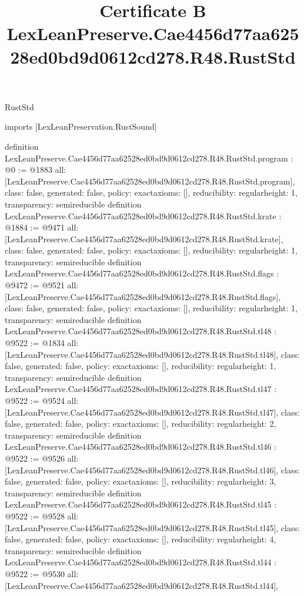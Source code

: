 \begin{lexlean}{RustStd}
\title{Certificate B LexLeanPreserve.Cae4456d77aa62528ed0bd9d0612cd278.R48.RustStd}
\begin{coremodule}
imports [LexLeanPreservation.RustSound]

definition LexLeanPreserve.Cae4456d77aa62528ed0bd9d0612cd278.R48.RustStd.program : @0 := @1883 {
  all: [LexLeanPreserve.Cae4456d77aa62528ed0bd9d0612cd278.R48.RustStd.program],
  class: false,
  generated: false,
  policy: exact{axioms: []},
  reducibility: regular{height: 1},
  transparency: semireducible
}
definition LexLeanPreserve.Cae4456d77aa62528ed0bd9d0612cd278.R48.RustStd.krate : @1884 := @9471 {
  all: [LexLeanPreserve.Cae4456d77aa62528ed0bd9d0612cd278.R48.RustStd.krate],
  class: false,
  generated: false,
  policy: exact{axioms: []},
  reducibility: regular{height: 1},
  transparency: semireducible
}
definition LexLeanPreserve.Cae4456d77aa62528ed0bd9d0612cd278.R48.RustStd.flags : @9472 := @9521 {
  all: [LexLeanPreserve.Cae4456d77aa62528ed0bd9d0612cd278.R48.RustStd.flags],
  class: false,
  generated: false,
  policy: exact{axioms: []},
  reducibility: regular{height: 1},
  transparency: semireducible
}
definition LexLeanPreserve.Cae4456d77aa62528ed0bd9d0612cd278.R48.RustStd.tl48 : @9522 := @1834 {
  all: [LexLeanPreserve.Cae4456d77aa62528ed0bd9d0612cd278.R48.RustStd.tl48],
  class: false,
  generated: false,
  policy: exact{axioms: []},
  reducibility: regular{height: 1},
  transparency: semireducible
}
definition LexLeanPreserve.Cae4456d77aa62528ed0bd9d0612cd278.R48.RustStd.tl47 : @9522 := @9524 {
  all: [LexLeanPreserve.Cae4456d77aa62528ed0bd9d0612cd278.R48.RustStd.tl47],
  class: false,
  generated: false,
  policy: exact{axioms: []},
  reducibility: regular{height: 2},
  transparency: semireducible
}
definition LexLeanPreserve.Cae4456d77aa62528ed0bd9d0612cd278.R48.RustStd.tl46 : @9522 := @9526 {
  all: [LexLeanPreserve.Cae4456d77aa62528ed0bd9d0612cd278.R48.RustStd.tl46],
  class: false,
  generated: false,
  policy: exact{axioms: []},
  reducibility: regular{height: 3},
  transparency: semireducible
}
definition LexLeanPreserve.Cae4456d77aa62528ed0bd9d0612cd278.R48.RustStd.tl45 : @9522 := @9528 {
  all: [LexLeanPreserve.Cae4456d77aa62528ed0bd9d0612cd278.R48.RustStd.tl45],
  class: false,
  generated: false,
  policy: exact{axioms: []},
  reducibility: regular{height: 4},
  transparency: semireducible
}
definition LexLeanPreserve.Cae4456d77aa62528ed0bd9d0612cd278.R48.RustStd.tl44 : @9522 := @9530 {
  all: [LexLeanPreserve.Cae4456d77aa62528ed0bd9d0612cd278.R48.RustStd.tl44],
}
\end{coremodule}
\end{lexlean}
